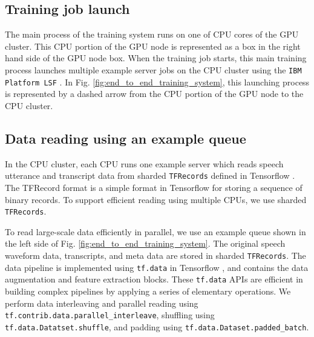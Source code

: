 \documentclass[a4paper]{article}
\begin{document}
\vspace{-1mm}
\subsection{Training job launch}
The main process of the training system runs on one of CPU cores 
of the GPU cluster. This CPU portion of the GPU node is represented
as a box in the right hand side of the GPU node box.
When the training job starts, this main training process launches
multiple example server jobs on the CPU cluster using the 
{\tt IBM Platform LSF} \cite{ibm_spectrum_lsf_2010}. In Fig. 
\ref{fig:end_to_end_training_system}, this launching process is represented
by a dashed arrow from the CPU portion of the GPU node to the 
CPU cluster. 


\subsection{Data reading using an example queue}
In the CPU cluster, each CPU runs one example server
which reads speech utterance and transcript data from sharded 
{\tt TFRecords} defined in Tensorflow \cite{m_abadi_usenix_2016}.
The TFRecord format is a simple format in Tensorflow for storing 
a sequence of binary records. To support efficient reading using 
multiple CPUs, we use sharded {\tt TFRecords}.

To read large-scale data efficiently in parallel, we use an example queue
shown in the left side of Fig. \ref{fig:end_to_end_training_system}.  
The original speech waveform data, transcripts, and meta data are stored
in sharded {\tt TFRecords}. The data pipeline is implemented using
{\tt tf.data} in Tensorflow \cite{m_abadi_usenix_2016}, 
and contains the data augmentation and feature extraction blocks.
These {\tt tf.data} APIs are efficient in building complex pipelines
by applying a series of elementary operations. We perform data interleaving
and parallel reading using {\tt tf.contrib.data.parallel\_interleave}, 
shuffling using {\tt tf.data.Datatset.shuffle}, and padding using 
{\tt tf.data.Dataset.padded\_batch}.
\end{document}

